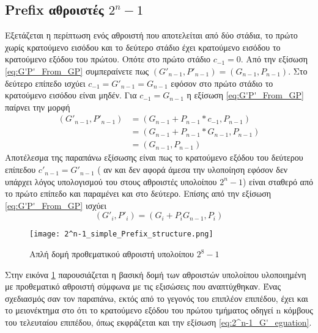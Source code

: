 \subsection{Prefix αθροιστές $2^n-1$ }
Εξετάζεται η περίπτωση ενός αθροιστή που αποτελείται από δύο στάδια, το πρώτο χωρίς κρατούμενο εισόδου
και το δεύτερο στάδιο έχει κρατούμενο εισόδου το κρατούμενο εξόδου του πρώτου. Οπότε στο
πρώτο στάδιο $c_{-1} = 0$. Από την εξίσωση \ref{eq:G'P'_From_GP} συμπεραίνετε πως 
$(G'_{n-1},P'_{n-1}) = (G_{n-1},P_{n-1})$. Στο δεύτερο επίπεδο ισχύει 
$c_{-1} = G'_{n-1} = G_{n-1} $ εφόσον στο πρώτο στάδιο το κρατούμενο εισόδου είναι μηδέν.
Για $c_{-1} = G_{n-1}$ η εξίσωση \ref{eq:G'P'_From_GP} παίρνει την μορφή 
\begin{equation*}
\begin{split}
    (G'_{n-1},P'_{n-1}) &= ( G_{n-1} + P_{n-1}*c_{-1} ,  P_{n-1} )\\
    &=( G_{n-1} + P_{n-1}*G_{n-1} ,  P_{n-1} )\\
    &=(G_{n-1},P_{n-1})
\end{split}    
\end{equation*}
Αποτέλεσμα της παραπάνω εξίσωσης είναι πως το κρατούμενο εξόδου του δεύτερου επίπεδου 
$c'_{n-1} = G'_{n-1}$
( αν και δεν αφορά άμεσα την υλοποίηση εφόσον δεν υπάρχει λόγος υπολογισμού του 
στους αθροιστές υπολοίπου $2^n-1$) είναι σταθερό από το πρώτο επίπεδο και παραμένει και στο 
δεύτερο. Επίσης από την εξίσωση \ref{eq:G'P'_From_GP} ισχύει 
\begin{equation}
\label{eq:2^n-1_G'_eguation}
    (G'_i,P'_i) = (G_i + P_iG_{n-1} , P_{i})
\end{equation}

\begin{figure}[H]
    \centering
    \texttt{[image: 2^n-1\_simple\_Prefix\_structure.png]}
    \caption{Απλή δομή προθεματικού αθροιστή υπολοίπου $2^8-1$}
    \label{fig:2^n-1_simple_Prefix_structure}
\end{figure}
Στην εικόνα \ref{fig:2^n-1_simple_Prefix_structure} παρουσιάζεται η βασική δομή των αθροιστών υπολοίπου υλοποιημένη με προθεματικό αθροιστή σύμφωνα με τις εξισώσεις που αναπτύχθηκαν.
Ένας σχεδιασμός σαν τον παραπάνω, εκτός από το γεγονός του επιπλέον επιπέδου,
έχει και το μειονέκτημα στο ότι το κρατούμενο εξόδου του πρώτου τμήματος οδηγεί 
n κόμβους του τελευταίου επιπέδου, όπως εκφράζεται και την εξίσωση \ref{eq:2^n-1_G'_eguation}.

















